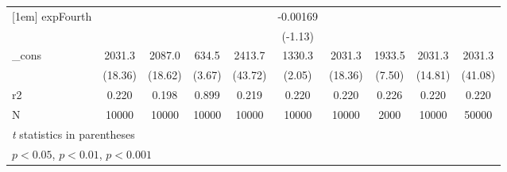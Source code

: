 \begin{table}[htbp]
\begin{tabular}{l*{9}{c}}
[1em]
expFourth   &                     &                     &                     &                     &    -0.00169         &                     &                     &                     &                     \\
            &                     &                     &                     &                     &     (-1.13)         &                     &                     &                     &                     \\
[1em]
\_cons      &      2031.3\sym{***}&      2087.0\sym{***}&       634.5\sym{***}&      2413.7\sym{***}&      1330.3\sym{*}  &      2031.3\sym{***}&      1933.5\sym{***}&      2031.3\sym{***}&      2031.3\sym{***}\\
            &     (18.36)         &     (18.62)         &      (3.67)         &     (43.72)         &      (2.05)         &     (18.36)         &      (7.50)         &     (14.81)         &     (41.08)         \\
\hline
r2          &       0.220         &       0.198         &       0.899         &       0.219         &       0.220         &       0.220         &       0.226         &       0.220         &       0.220         \\
N           &       10000         &       10000         &       10000         &       10000         &       10000         &       10000         &        2000         &       10000         &       50000         \\
\hline\hline
\multicolumn{10}{l}{\footnotesize \textit{t} statistics in parentheses}\\
\multicolumn{10}{l}{\footnotesize \sym{*} \(p<0.05\), \sym{**} \(p<0.01\), \sym{***} \(p<0.001\)}\\
\end{tabular}
\end{table}
